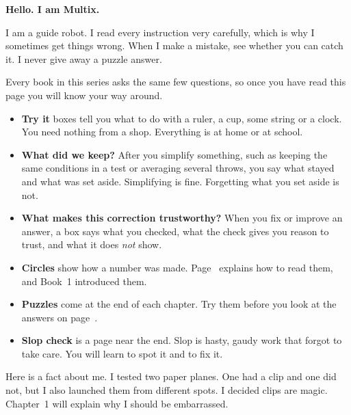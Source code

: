 {\sans\bfseries\LARGE\color{ink} Hello. I am Multix.}\par
\begin{multix}[wow]\multixbot[wow]\tcblower
I am a guide robot. I read every instruction very carefully, which is why I sometimes get things wrong.
When I make a mistake, see whether you can catch it. I never give away a puzzle answer.
\end{multix}

Every book in this series asks the same few questions, so once you have read this page you will know your way around.

\begin{itemize}[leftmargin=1.6em,itemsep=0.45em]
\item[\textcolor{leaf}{\ding{108}}] \textbf{Try it} boxes tell you what to do with a ruler, a cup, some string or a clock. You need nothing from a shop. Everything is at home or at school.
\item[\textcolor{sun!80!black}{\ding{108}}] \textbf{What did we keep?} After you simplify something, such as keeping the same conditions in a test or averaging several throws, you say what stayed and what was set aside. Simplifying is fine. Forgetting what you set aside is not.
\item[\textcolor{tangerine}{\ding{108}}] \textbf{What makes this correction trustworthy?} When you fix or improve an answer, a box says what you checked, what the check gives you reason to trust, and what it does \emph{not} show.
\item[\textcolor{sky}{\ding{108}}] \textbf{Circles} show how a number was made. Page~\pageref{circlecard} explains how to read them, and Book~1 introduced them.
\item[\textcolor{grape}{\ding{108}}] \textbf{Puzzles} come at the end of each chapter. Try them before you look at the answers on page~\pageref{answers}.
\item[\textcolor{tomato}{\ding{108}}] \textbf{Slop check} is a page near the end. Slop is hasty, gaudy work that forgot to take care. You will learn to spot it and to fix it.
\end{itemize}

\begin{multix}[hmm]\multixbot[hmm]\tcblower
Here is a fact about me. I tested two paper planes. One had a clip and one did not, but I also launched them from different spots. I decided clips are magic. Chapter~1 will explain why I should be embarrassed.
\end{multix}
\clearpage

